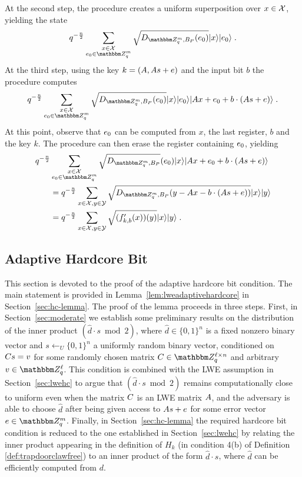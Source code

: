 \begin{enumerate}
At the second step, the procedure creates a uniform superposition over $x\in \mathcal{X}$, yielding the state
\begin{equation}
q^{-\frac{n}{2}}\sum_{\substack{x\in \sX \\ \*e_0\in \mZ_q^{m}}} \sqrt{D_{\mZ_q^m,B_P}(\*e_0)}\ket{x}\ket{\*e_0}\;.
\end{equation}
At the third step, using the key $k = (\*A,\*A\*s + \*e)$ and the input bit $b$ the procedure computes  
\begin{equation}\label{eq:priortoerasingerror}
q^{-\frac{n}{2}}\sum_{\substack{x\in \sX \\ \*e_0\in \mZ_q^{m}}} \sqrt{D_{\mZ_q^m,B_P}(\*e_0)}\ket{x}\ket{\*e_0}\ket{\*Ax + \*e_0 + b\cdot (\*A\*s + \*e)}\;.
\end{equation}
At this point, observe that $\*e_0$ can be computed from $x$, the last register, $b$ and the key $k$. The procedure can then erase the register containing $\*e_0$, yielding 
\begin{align}
q^{-\frac{n}{2}}&\sum_{\substack{x\in \sX \\ \*e_0\in \mZ_q^{m}}} \sqrt{D_{\mZ_q^m,B_P}}(\*e_0)\ket{x}\ket{\*Ax + \*e_0 + b\cdot (\*A\*s + \*e)}\nonumber\\
&=q^{-\frac{n}{2}}\sum_{x\in \sX , y\in \sY}\sqrt{D_{\mZ_q^m,B_P}(y - \*Ax - b\cdot(\*A\*s + \*e))}\ket{x}\ket{y}\nonumber\\
&=  q^{-\frac{n}{2}}\sum_{x\in \sX ,y\in\sY}\sqrt{(f'_{k,b}(x))(y)}\ket{x}\ket{y}\;.\label{eq:fprimestate}
\end{align}

\end{enumerate}




\subsection{Adaptive Hardcore Bit} 
\label{sec:adaptive-bit}
This section is devoted to the proof of the adaptive hardcore bit condition. The main statement is provided in Lemma~\ref{lem:lweadaptivehardcore} in Section~\ref{sec:hc-lemma}. The proof of the lemma proceeds in three steps. First, in Section~\ref{sec:moderate} we establish some preliminary results on the distribution of the inner product $(\hat{d}\cdot s \bmod 2)$, where $\hat{d}\in\{0,1\}^n$ is a fixed nonzero binary vector and $s\leftarrow_U \{0,1\}^n$ a uniformly random binary vector, conditioned on $\*C\*s=\*v$ for some randomly chosen matrix $\*C\in \mZ_q^{\ell\times n}$ and arbitrary $\*v\in\mZ_q^{\ell}$. This condition is combined with the LWE assumption in Section~\ref{sec:lwehc} to argue that  $(\hat{d}\cdot s \bmod 2)$ remains computationally close to uniform even when the matrix $\*C$ is an LWE matrix $\*A$, and the adversary is able to choose $\hat{d}$ after being given access to $\*A\*s+\*e$ for some error vector $\*e\in\mZ_q^m$. Finally, in Section~\ref{sec:hc-lemma} the required hardcore bit condition is reduced to the one established in  Section~\ref{sec:lwehc} by relating the inner product appearing in the definition of $H_k$ (in condition 4(b) of Definition \ref{def:trapdoorclawfree}) to an inner product of the form $\hat{d}\cdot s$, where $\hat{d}$ can be efficiently computed from $d$.  

